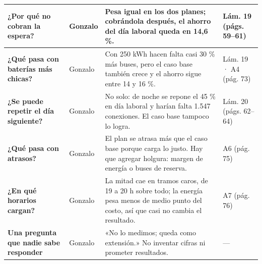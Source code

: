 \documentclass[12pt]{article}
\begin{document}
{\begin{longtable}{@{}>{\raggedright\arraybackslash}p{3.5cm} >{\raggedright\arraybackslash}p{1.95cm} >{\raggedright\arraybackslash}p{7.45cm} >{\raggedright\arraybackslash}p{2.5cm}@{}}
\textbf{¿Por qué no cobran la espera?} & Gonzalo & Pesa igual en los dos planes; cobrándola después, el ahorro del día laboral queda en 14,6 \%. & {\small Lám. 19 (págs. 59–61)} \\ \midrule
\textbf{¿Qué pasa con baterías más chicas?} & Gonzalo & Con 250 kWh hacen falta casi 30 \% más buses, pero el caso base también crece y el ahorro sigue entre 14 y 16 \%. & {\small Lám. 19 · A4 (pág. 73)} \\ \midrule
\textbf{¿Se puede repetir el día siguiente?} & Gonzalo & No solo: de noche se repone el 45 \% en día laboral y harían falta 1.547 conexiones. El caso base tampoco lo logra. & {\small Lám. 20 (págs. 62–64)} \\ \midrule
\textbf{¿Qué pasa con atrasos?} & Gonzalo & El plan se atrasa más que el caso base porque carga lo justo. Hay que agregar holgura: margen de energía o buses de reserva. & {\small A6 (pág. 75)} \\ \midrule
\textbf{¿En qué horarios cargan?} & Gonzalo & La mitad cae en tramos caros, de 19 a 20 h sobre todo; la energía pesa menos de medio punto del costo, así que casi no cambia el resultado. & {\small A7 (pág. 76)} \\ \midrule
\textbf{Una pregunta que nadie sabe responder} & Gonzalo & «No lo medimos; queda como extensión.» No inventar cifras ni prometer resultados. & {\small —} \\ \midrule
\end{longtable}}
\end{document}
